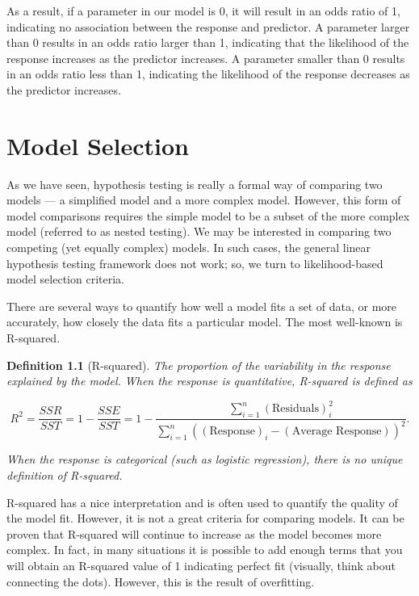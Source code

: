 \documentclass[
]{book}
\theoremstyle{plain}
\theoremstyle{mydefn}
\newtheorem{definition}{Definition}[chapter]
\theoremstyle{myexmpl}
\theoremstyle{remark}
\begin{document}
As a result, if a parameter in our model is 0, it will result in an odds ratio of 1, indicating no association between the response and predictor. A parameter larger than 0 results in an odds ratio larger than 1, indicating that the likelihood of the response increases as the predictor increases. A parameter smaller than 0 results in an odds ratio less than 1, indicating the likelihood of the response decreases as the predictor increases.

\hypertarget{nlm-selection}{%
\chapter{Model Selection}\label{nlm-selection}}

As we have seen, hypothesis testing is really a formal way of comparing two models --- a simplified model and a more complex model. However, this form of model comparisons requires the simple model to be a subset of the more complex model (referred to as nested testing). We may be interested in comparing two competing (yet equally complex) models. In such cases, the general linear hypothesis testing framework does not work; so, we turn to likelihood-based model selection criteria.

There are several ways to quantify how well a model fits a set of data, or more accurately, how closely the data fits a particular model. The most well-known is R-squared.

\begin{definition}[R-squared]
\protect\hypertarget{def:defn-r-squared}{}{\label{def:defn-r-squared} {} }The proportion of the variability in the response explained by the model. When the response is quantitative, R-squared is defined as

\[R^2 = \frac{SSR}{SST} = 1 - \frac{SSE}{SST} = 1 - \frac{\sum_{i=1}^{n} (\text{Residuals})_i^2}{\sum_{i=1}^{n} \left((\text{Response})_i - (\text{Average Response})\right)^2}.\]

When the response is categorical (such as logistic regression), there is no unique definition of R-squared.
\end{definition}

R-squared has a nice interpretation and is often used to quantify the quality of the model fit. However, it is not a great criteria for comparing models. It can be proven that R-squared will continue to increase as the model becomes more complex. In fact, in many situations it is possible to add enough terms that you will obtain an R-squared value of 1 indicating perfect fit (visually, think about connecting the dots). However, this is the result of overfitting.
\end{document}
